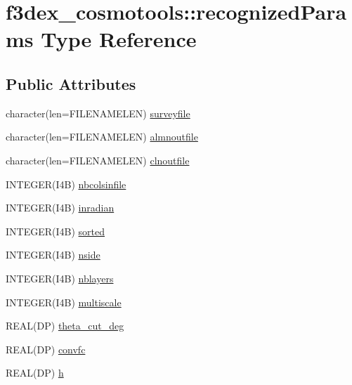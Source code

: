 \hypertarget{typef3dex__cosmotools_1_1recognized_params}{
\section{f3dex\_\-cosmotools::recognizedParams Type Reference}
\label{typef3dex__cosmotools_1_1recognized_params}
}
\subsection*{Public Attributes}
\begin{DoxyCompactItemize}
\item 
character(len=FILENAMELEN) \hyperlink{typef3dex__cosmotools_1_1recognized_params_a7efee7086908340e3aa2bd28ce5b9005}{surveyfile}
\item 
character(len=FILENAMELEN) \hyperlink{typef3dex__cosmotools_1_1recognized_params_a1bb219157b5d884dee879611d2681799}{almnoutfile}
\item 
character(len=FILENAMELEN) \hyperlink{typef3dex__cosmotools_1_1recognized_params_a69c1862dd1d799d9b5bc9f425013ce77}{clnoutfile}
\item 
INTEGER(I4B) \hyperlink{typef3dex__cosmotools_1_1recognized_params_a6f2ceeddaa65071f8b0f2c1df017fdb9}{nbcolsinfile}
\item 
INTEGER(I4B) \hyperlink{typef3dex__cosmotools_1_1recognized_params_a4d549e6d9fc5846730420a9c1afadad4}{inradian}
\item 
INTEGER(I4B) \hyperlink{typef3dex__cosmotools_1_1recognized_params_a09746178e4eccb40629aec42894f2ba6}{sorted}
\item 
INTEGER(I4B) \hyperlink{typef3dex__cosmotools_1_1recognized_params_ac0f1c10328111e02b1bfbe5c368b1eb7}{nside}
\item 
INTEGER(I4B) \hyperlink{typef3dex__cosmotools_1_1recognized_params_a9e77c832d720a90e42f78909fe636d99}{nblayers}
\item 
INTEGER(I4B) \hyperlink{typef3dex__cosmotools_1_1recognized_params_af05862653d2611ab453a39910888c6ec}{multiscale}
\item 
REAL(DP) \hyperlink{typef3dex__cosmotools_1_1recognized_params_ad67dc289e96be582ba36b4a960d36467}{theta\_\-cut\_\-deg}
\item 
REAL(DP) \hyperlink{typef3dex__cosmotools_1_1recognized_params_aaf93c238ca73e73267becded53135fe8}{convfc}
\item 
REAL(DP) \hyperlink{typef3dex__cosmotools_1_1recognized_params_a40d4fff5828ba45bb5239d2dec3edbb9}{h}

\end{DoxyCompactItemize}
